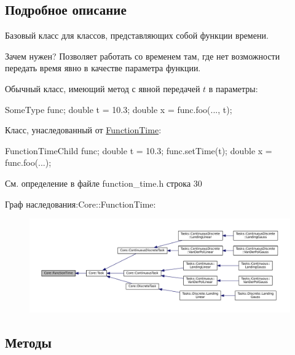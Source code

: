 \subsection{Подробное описание}
Базовый класс для классов, представляющих собой функции времени. 

Зачем нужен? Позволяет работать со временем там, где нет возможности передать время явно в качестве параметра функции.

Обычный класс, имеющий метод с явной передачей $t$ в параметры\+: 
\begin{DoxyCode}
SomeType func;
\textcolor{keywordtype}{double} t = 10.3;
\textcolor{keywordtype}{double} x = func.foo(..., t);
\end{DoxyCode}
 Класс, унаследованный от \hyperlink{class_core_1_1_function_time}{Function\+Time}\+: 
\begin{DoxyCode}
FunctionTimeChild func;
\textcolor{keywordtype}{double} t = 10.3;
func.setTime(t);
\textcolor{keywordtype}{double} x = func.foo(...);
\end{DoxyCode}
 

См. определение в файле function\+\_\+time.\+h строка 30



Граф наследования\+:Core\+:\+:Function\+Time\+:
\nopagebreak
\begin{figure}[H]
\begin{center}
\leavevmode
\includegraphics[width=350pt]{class_core_1_1_function_time__inherit__graph}
\end{center}
\end{figure}


\subsection{Методы}
\hypertarget{class_core_1_1_function_time_a1f1674cdfd0a24f69934467369e30267}{}\label{class_core_1_1_function_time_a1f1674cdfd0a24f69934467369e30267} 
